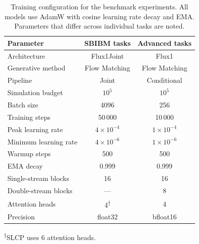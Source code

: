 \begin{table}[t]
\centering
\caption{ Training configuration for the benchmark experiments. All models use AdamW with cosine learning rate decay and EMA. Parameters that differ across individual tasks are noted.}
\label{tab:training_config}
\small
\begin{tabular}{@{}lcc@{}}
\toprule
\textbf{Parameter} & \textbf{SBIBM tasks} & \textbf{Advanced tasks} \\
\midrule
Architecture & Flux1Joint & Flux1 \\
Generative method & Flow Matching & Flow Matching \\
Pipeline & Joint & Conditional \\
Simulation budget & $10^5$ & $10^5$ \\
Batch size & 4096 & 256 \\
Training steps & 50\,000 & 10\,000 \\
Peak learning rate & $4 \times 10^{-4}$ & $1 \times 10^{-4}$ \\
Minimum learning rate & $4 \times 10^{-6}$ & $1 \times 10^{-6}$ \\
Warmup steps & 500 & 500 \\
EMA decay & 0.999 & 0.999 \\
Single-stream blocks & 16 & 16 \\
Double-stream blocks & --- & 8 \\
Attention heads & 4\textsuperscript{$\dagger$} & 4 \\
Precision & float32 & bfloat16 \\
\bottomrule
\end{tabular}
\par\smallskip
{\footnotesize \textsuperscript{$\dagger$}SLCP uses 6 attention heads.}
\end{table}